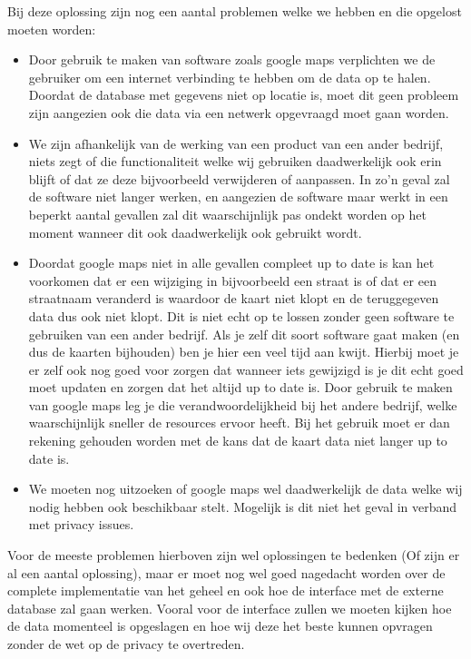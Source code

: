 Bij deze oplossing zijn nog een aantal problemen welke we hebben en die opgelost moeten worden:
\begin{itemize}
        \item Door gebruik te maken van software zoals google maps verplichten we de gebruiker om een internet verbinding te hebben om de data op te halen. Doordat de database met gegevens niet op locatie is, moet dit geen probleem zijn aangezien ook die data via een netwerk opgevraagd moet gaan worden.
        \item We zijn afhankelijk van de werking van een product van een ander bedrijf, niets zegt of die functionaliteit welke wij  gebruiken daadwerkelijk ook erin blijft of dat ze deze bijvoorbeeld verwijderen of aanpassen. In zo'n geval zal de software niet langer werken, en aangezien de software maar werkt in een beperkt aantal gevallen zal dit waarschijnlijk pas ondekt worden op het moment wanneer dit ook daadwerkelijk ook gebruikt wordt. 
        \item Doordat google maps niet in alle gevallen compleet up to date is kan het voorkomen dat er een wijziging in bijvoorbeeld een straat is of dat er een straatnaam veranderd is waardoor de kaart niet klopt en de teruggegeven data dus ook niet klopt. Dit is niet echt op te lossen zonder geen software te gebruiken van een ander bedrijf. Als je zelf dit soort software gaat maken (en dus de kaarten bijhouden) ben je hier een veel tijd aan kwijt. Hierbij moet je er zelf ook nog goed voor zorgen dat wanneer iets gewijzigd is je dit echt goed moet updaten en zorgen dat het altijd up to date is. Door gebruik te maken van google maps leg je die verandwoordelijkheid bij het andere bedrijf, welke waarschijnlijk sneller de resources ervoor heeft. Bij het gebruik moet er dan rekening gehouden worden met de kans dat de kaart data niet langer up to date is. 
        \item We moeten nog uitzoeken of google maps wel daadwerkelijk de data welke wij nodig hebben ook beschikbaar stelt. Mogelijk is dit niet het geval in verband met privacy issues.
\end{itemize}
Voor de meeste problemen hierboven zijn wel oplossingen te bedenken (Of zijn er al een aantal oplossing), maar er moet nog wel goed nagedacht worden over de complete implementatie van het geheel en ook hoe de interface met de externe database zal gaan werken. Vooral voor de interface zullen we moeten kijken hoe de data momenteel is opgeslagen en hoe wij deze het beste kunnen opvragen zonder de wet op de privacy te overtreden.
